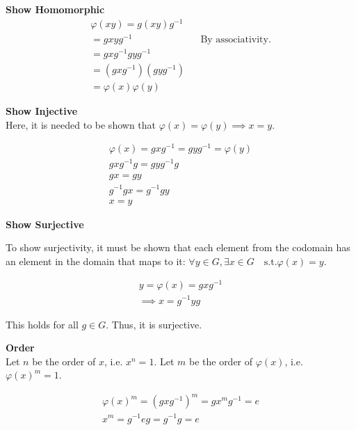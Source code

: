 \documentclass[12pt,letterpaper]{article}
\begin{document}
\textbf{Show Homomorphic} \\

\begin{equation}
   \begin{aligned}
      \varphi(xy) = g(xy)g^{-1} \\
         = gxyg^{-1} && \text{By associativity.} \\
         = gxg^{-1}gyg^{-1} \\
         = (gxg^{-1})(gyg^{-1}) \\
         = \varphi(x) \varphi(y)
   \end{aligned}
\end{equation}

\textbf{Show Injective} \\

Here, it is needed to be shown that $\varphi(x) = \varphi(y) \implies x = y$.

\begin{equation}
   \begin{aligned}
      \varphi(x) = gxg^{-1} = gyg^{-1} = \varphi(y) \\
      gxg^{-1}g = gyg^{-1}g \\
      gx = gy \\
      g^{-1}gx = g^{-1}gy \\
      x = y
   \end{aligned}
\end{equation}

\textbf{Show Surjective}

To show surjectivity, it must be shown that each element from the codomain has an element in the domain 
that maps to it: $\forall y \in G, \exists x \in G \quad \text{s.t.} \varphi(x) = y$.

\begin{equation}
   \begin{aligned}
      y = \varphi(x) = gxg^{-1} \\
      \implies x = g^{-1} y g
   \end{aligned}
\end{equation}

This holds for all $g \in G$.  Thus, it is surjective.

\textbf{Order} \\

Let $n$ be the order of $x$, i.e. $x^n = 1$.
Let $m$ be the order of $\varphi(x)$, i.e. $\varphi(x)^m = 1$.

\begin{equation}
   \begin{aligned}
      \varphi(x)^m = (gxg^{-1})^m 
      = gx^mg^{-1} = e \\
      x^m = g^{-1}eg = g^{-1}g = e
   \end{aligned}
\end{equation}
\end{document}
